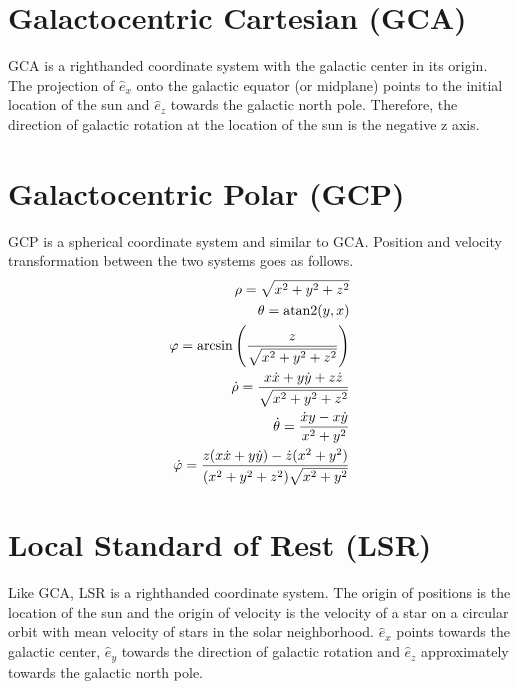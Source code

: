 \documentclass[letterpaper,10pt,english]{sphinxmanual}
\begin{document}
\section{Galactocentric Cartesian (GCA)}
\label{\detokenize{NBodySimulation/CoordinateSystems:galactocentric-cartesian-gca}}
\sphinxAtStartPar
GCA is a right\sphinxhyphen{}handed coordinate system with the galactic center in its origin.
The projection of \(\hat{e}_x\) onto the galactic equator (or midplane) points to the initial location of the sun and
\(\hat{e}_z\) towards the galactic north pole. Therefore, the direction of galactic rotation at the location of the sun is the negative z axis.


\section{Galactocentric Polar (GCP)}
\label{\detokenize{NBodySimulation/CoordinateSystems:galactocentric-polar-gcp}}
\sphinxAtStartPar
GCP is a spherical coordinate system and similar to GCA.
Position and velocity transformation between the two systems goes as follows.
\begin{equation}\label{equation:NBodySimulation/CoordinateSystems:GCA_to_GCP}
\begin{split}\rho  = \sqrt{x^2+y^2+z^2} \\
\theta = \textup{atan2}{\left ( y,x \right )}\\
\varphi  = \arcsin\left ( \frac{z}{\sqrt{x^2+y^2+z^2}} \right ) \\
\dot{\rho} =  \frac{x\dot{x}+y\dot{y}+z\dot{z}}{\sqrt{x^2+y^2+z^2}}\\
\dot{\theta} = \frac{\dot{x}y-x\dot{y}}{x^2+y^2} \\
\dot{\varphi} = \frac{z(x\dot{x}+y\dot{y})-\dot{z}(x^2+y^2)}{(x^2+y^2+z^2)\sqrt{x^2+y^2}}\end{split}
\end{equation}

\section{Local Standard of Rest (LSR)}
\label{\detokenize{NBodySimulation/CoordinateSystems:local-standard-of-rest-lsr}}
\sphinxAtStartPar
Like GCA, LSR is a right\sphinxhyphen{}handed coordinate system.
The origin of positions is the location of the sun
and the origin of velocity is the velocity of a star on a circular orbit with mean velocity of stars in the solar neighborhood.
\(\hat{e}_x\) points towards the galactic center, \(\hat{e}_y\) towards the direction of galactic rotation
and \(\hat{e}_z\) approximately towards the galactic north pole.
\end{document}
